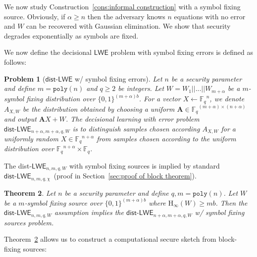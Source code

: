 \documentclass[11pt]{article}
\newcommand{\secref}[1]{\mbox{Section~\ref{#1}}}
\newcommand{\thref}[1]{\mbox{Theorem~\ref{#1}}}
\newcommand{\consref}[1]{\mbox{Construction~\ref{#1}}}
\newcommand{\class}[1]{{\ensuremath{\mathsf{#1}}}}
\newcommand{\zo}{\ensuremath{\{0, 1\}}}
\newcommand{\vect}[1]{\ensuremath{\textbf{#1}}}
\newcommand{\Fq}{\ensuremath{\mathbb{F}_q}}
\newcommand{\poly}{\ensuremath{\mathtt{poly}}\xspace}
\newcommand{\Hoo}{\mathrm{H}_\infty}
\newcommand{\LWE}{\class{LWE}}
\newcommand{\distLWE}{\ensuremath{\class{dist\mbox{-}LWE}}}
\newtheorem{theorem}{Theorem}[section]
\newtheorem{assumption}[theorem]{Assumption}
\newtheorem{problem}[theorem]{Problem}
\newcommand{\authnote}[2]{{\textcolor{red}{\textsf{#1 notes: }\textcolor{blue}{ #2}}\marginpar{\textcolor{red}{\textbf{!!!!!}}}}}
\newcommand{\authnote}[2]{}
\newcommand{\lnote}[1]{{\authnote{Leo}{#1}}}
\newcommand{\vA}{\vect{A}}
\newcommand{\ignore}[1]{}
\begin{document}
We now study \consref{cons:informal construction} with a symbol fixing source.  Obviously, if $\alpha \geq n$ then the adversary knows $n$ equations with no error and $W$ can be recovered with Gaussian elimination.  We show that security degrades exponentially as symbols are fixed.
\ignore{
\begin{assumption}[LWE w/ entropic errors]
Let $n$ be a security parameter and define $m = \poly(n)$ and $q\geq 2$ be integers.  Let $W = W_1||...||W_{m+\alpha}$ be a $m$-block fixing distribution over $\{0,1\}^{(m+\alpha)\ell}$. For a vector 
Let $A\in\Fq^{(m+\alpha)\times (n+\alpha)}$ and let $x\in\Fq^{n+\alpha}$.  No PPT algorithm given $Ax+W$ can recover $x$ with probability greater than nonnegligible.
\end{assumption}
}
We now define the decisional $\LWE$ problem with symbol fixing errors is defined as follows: 
\begin{problem}[$\distLWE$ w/ symbol fixing errors]
Let $n$ be a security parameter and define $m = \poly(n)$ and $q\geq 2$ be integers.  Let $W = W_1||...||W_{m+\alpha}$ be a $m$-symbol fixing distribution over $\{0,1\}^{(m+\alpha)b}$. For a vector $X \leftarrow \Fq^n$, we denote $A_{X, W}$ be the distribution obtained by choosing a uniform $\vA\in\Fq^{(m+\alpha)\times (n+\alpha)}$ and output $\vA X + W$. The decisional learning with error problem $\distLWE_{n+\alpha, m+\alpha, q, W}$ is to distinguish samples chosen according $A_{X, W}$ for a uniformly random $X \in \Fq^{n+\alpha}$ from samples chosen according to the uniform distribution over $\Fq^{n+\alpha} \times \Fq$.
\end{problem}

The dist-$\LWE_{n, m, q, W}$ with symbol fixing sources is implied by standard $\distLWE_{n, m, q, \chi}$~(proof in \secref{sec:proof of block theorem}).
\begin{theorem}
\label{thm:blockLWE}
Let $n$ be a security parameter and define $q, m = \poly(n)$.  Let $W$ be a $m$-symbol fixing source over $\{0,1\}^{(m+\alpha)b}$ where $\Hoo(W) \geq mb$.  Then the $\distLWE_{n, m,q, W}$ assumption implies the $\distLWE_{n+\alpha, m+\alpha, q, W}$ w/ symbol fixing sources problem.
\end{theorem}

\thref{thm:blockLWE} allows us to construct a computational secure sketch from block-fixing sources: 

\end{document}
